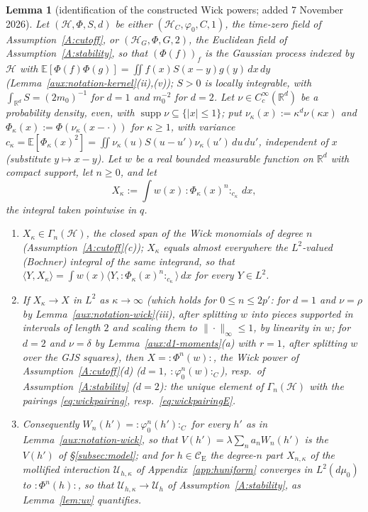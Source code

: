 \documentclass[11pt,a4paper]{article}
\theoremstyle{plain}
\theoremstyle{definition}
\theoremstyle{plain}
\newtheorem{auxlemmaP}{Lemma}
\theoremstyle{definition}
\newcommand{\R}{\mathbb{R}}
\newcommand{\E}{\mathbb{E}}
\newcommand{\CE}{\mathcal{C}_{\mathrm E}}
\newcommand{\HH}{\mathcal{H}}
\newcommand{\ip}[2]{\langle #1,#2\rangle}
\DeclareMathOperator{\supp}{supp}
\newcommand{\dmu}{d\mu_0}
\begin{document}
\begin{auxlemmaP}[identification of the constructed Wick powers; added 7 November 2026]\label{aux:notation-ident}
Let $(\HH,\Phi,S,d)$ be either $(\HH_C,\varphi_0,C,1)$, the time-zero field of
Assumption~\ref{A:cutoff}, or $(\HH_G,\Phi,G,2)$, the Euclidean field of
Assumption~\ref{A:stability}, so that $(\Phi(f))_f$ is the Gaussian process indexed by $\HH$
with $\E[\Phi(f)\Phi(g)]=\iint f(x)S(x-y)g(y)\,dx\,dy$ (Lemma~\ref{aux:notation-kernel}(ii),(v));
$S>0$ is locally integrable, with $\int_{\R^d}S=(2m_0)^{-1}$ for $d=1$ and $m_0^{-2}$ for $d=2$.
Let $\nu\in C_c^\infty(\R^d)$ be a probability density, even, with $\supp\nu\subseteq\{|x|\le1\}$;
put $\nu_\kappa(x):=\kappa^d\nu(\kappa x)$ and $\Phi_\kappa(x):=\Phi(\nu_\kappa(x-\cdot))$ for
$\kappa\ge1$, with variance $c_\kappa=\E[\Phi_\kappa(x)^2]=\iint\nu_\kappa(u)S(u-u')\nu_\kappa(u')\,du\,du'$,
independent of $x$ (substitute $y\mapsto x-y$).  Let $w$ be a
real bounded measurable function on $\R^d$ with compact support, let $n\ge0$, and let
\[
 X_\kappa:=\int w(x)\,{:}\Phi_\kappa(x)^n{:}_{c_\kappa}\,dx ,
\]
the integral taken pointwise in $q$.
\begin{enumerate}
\item[\textup{(i)}] $X_\kappa\in\Gamma_n(\HH)$, the closed span of the Wick monomials of
degree $n$ (Assumption~\ref{A:cutoff}(c)); $X_\kappa$ equals almost everywhere the
$L^2$-valued (Bochner) integral of the same integrand, so that $\ip Y{X_\kappa}=\int w(x)
\ip Y{{:}\Phi_\kappa(x)^n{:}_{c_\kappa}}\,dx$ for every $Y\in L^2$.
\item[\textup{(ii)}] If $X_\kappa\to X$ in $L^2$ as $\kappa\to\infty$ (which holds for $0\le n\le2p'$:
for $d=1$ and $\nu=\rho$ by Lemma~\ref{aux:notation-wick}(iii), after splitting $w$ into pieces
supported in intervals of length $2$ and scaling them to $\|\cdot\|_\infty\le1$, by linearity
in $w$; for $d=2$ and $\nu=\delta$ by Lemma~\ref{aux:d1-moments}(a) with $r=1$, after splitting
$w$ over the GJS squares), then $X={:}\Phi^n(w){:}$, the Wick power of
Assumption~\ref{A:cutoff}(d) ($d=1$, ${:}\varphi_0^n(w){:}_C$), resp.\ of
Assumption~\ref{A:stability} ($d=2$): the unique element of $\Gamma_n(\HH)$ with the pairings
\eqref{eq:wickpairing}, resp.\ \eqref{eq:wickpairingE}.
\item[\textup{(iii)}] Consequently $W_n(h')={:}\varphi_0^n(h'){:}_C$ for every $h'$ as in
Lemma~\ref{aux:notation-wick}, so that $V(h')=\lambda\sum_na_nW_n(h')$ is the $V(h')$ of
\S\ref{subsec:model}; and for $h\in\CE$ the degree-$n$ part $X_{n,\kappa}$ of the mollified
interaction $\mathcal U_{h,\kappa}$ of Appendix~\ref{app:huniform} converges in $L^2(\dmu)$
to ${:}\Phi^n(h){:}$, so that $\mathcal U_{h,\kappa}\to\mathcal U_h$ of
Assumption~\ref{A:stability}, as Lemma~\ref{lem:uv} quantifies.
\end{enumerate}
\end{auxlemmaP}
\end{document}
